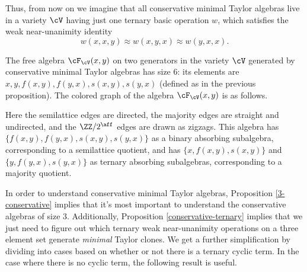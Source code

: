 Thus, from now on we imagine that all conservative minimal Taylor algebras live in a variety $\cV$ having just one ternary basic operation $w$, which satisfies the weak near-unanimity identity
\[
w(x,x,y) \approx w(x,y,x) \approx w(y,x,x).
\]

\begin{prop}\label{prop-conservative-free} The free algebra $\cF_\cV(x,y)$ on two generators in the variety $\cV$ generated by conservative minimal Taylor algebras has size $6$: its elements are $x, y, f(x,y), f(y,x), s(x,y), s(y,x)$ (defined as in the previous proposition). The colored graph of the algebra $\cF_\cV(x,y)$ is as follows.
\begin{center}
\end{center}
Here the semilattice edges are directed, the majority edges are straight and undirected, and the $\ZZ/2^{\aff}$ edges are drawn as zigzags. This algebra has $\{f(x,y), f(y,x), s(x,y), s(y,x)\}$ as a binary absorbing subalgebra, corresponding to a semilattice quotient, and has $\{x,f(x,y),s(x,y)\}$ and $\{y,f(y,x),s(y,x)\}$ as ternary absorbing subalgebras, corresponding to a majority quotient.
\end{prop}

In order to understand conservative minimal Taylor algebras, Proposition \ref{3-conservative} implies that it's most important to understand the conservative algebras of size $3$. Additionally, Proposition \ref{conservative-ternary} implies that we just need to figure out which ternary weak near-unanimity operations on a three element set generate \emph{minimal} Taylor clones. We get a further simplification by dividing into cases based on whether or not there is a ternary cyclic term. In the case where there is no cyclic term, the following result is useful.

